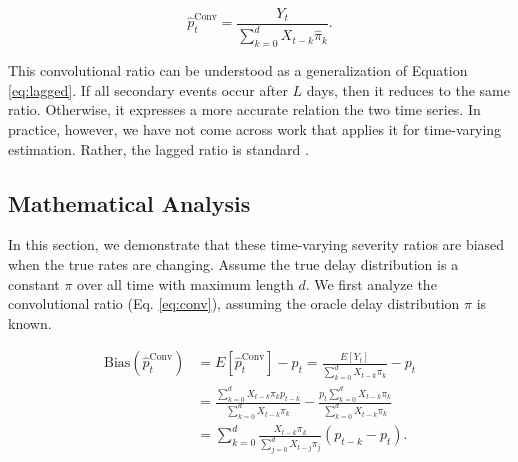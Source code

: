 \documentclass{article}
\begin{document}
\begin{equation}\label{eq:conv}
    \hat{p}_t^{\text{Conv}} = \frac{Y_t}{\sum_{k=0}^d X_{t-k}\hat\pi_k}.%
\end{equation}

\noindent This convolutional ratio can be understood as a generalization of Equation \ref{eq:lagged}. If all secondary events occur after $L$ days, then it reduces to the same ratio. Otherwise, it expresses a more accurate relation the two time series. In practice, however, we have not come across work that applies it for time-varying estimation. Rather, the lagged ratio is standard \cite{germany,horita2022global,timevar_ifr,yuan2020monitoring,LIU2023100350}.



\subsection{Mathematical Analysis}\label{sec:analysis}

In this section, we demonstrate that these time-varying severity ratios are biased when the true rates are changing. Assume the true delay distribution is a constant $\pi$ over all time with maximum length $d$. We first analyze the convolutional ratio (Eq. \ref{eq:conv}), assuming the oracle delay distribution $\pi$ is known.


\begin{align}\label{eq:ConvBias}
    \text{Bias}(\hat{p}_t^\text{Conv}) &= E[\hat{p}_t^\text{Conv}] - p_t = \frac{E[Y_t]}{\sum_{k=0}^d X_{t-k}\pi_k} - p_t \nonumber\\ 
    &= \frac{\sum_{k=0}^d X_{t-k}\pi_k p_{t-k}}{\sum_{k=0}^d X_{t-k}\pi_k} - \frac{p_t \sum_{k=0}^d X_{t-k}\pi_k}{\sum_{k=0}^d X_{t-k}\pi_k}\nonumber\\
    &= \sum_{k=0}^d \frac{X_{t-k}\pi_k}{\sum_{j=0}^d X_{t-j}\pi_j} (p_{t-k}-p_t).
\end{align}
\end{document}

